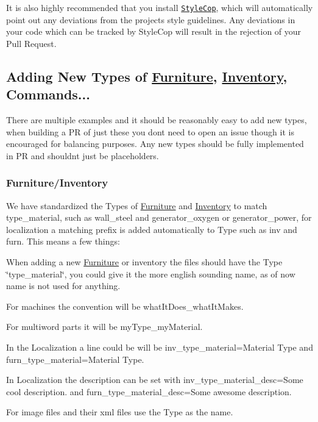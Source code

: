  

It is also highly recommended that you install \href{https://github.com/TeamPorcupine/ProjectPorcupine/wiki/StyleCop}{\tt Style\+Cop}, which will automatically point out any deviations from the project\textquotesingle{}s style guidelines. Any deviations in your code which can be tracked by Style\+Cop will result in the rejection of your Pull Request.

\subsection*{Adding New Types of \hyperlink{class_furniture}{Furniture}, \hyperlink{class_inventory}{Inventory}, Commands...}

There are multiple examples and it should be reasonably easy to add new types, when building a PR of just these you don\textquotesingle{}t need to open an issue though it is encouraged for balancing purposes. Any new types should be fully implemented in PR and shouldn\textquotesingle{}t just be placeholders.

\subsubsection*{Furniture/\+Inventory}

We have standardized the Types of \hyperlink{class_furniture}{Furniture} and \hyperlink{class_inventory}{Inventory} to match {\ttfamily type\+\_\+material}, such as {\ttfamily wall\+\_\+steel} and {\ttfamily generator\+\_\+oxygen} or {\ttfamily generator\+\_\+power}, for localization a matching prefix is added automatically to Type such as {\ttfamily inv} and {\ttfamily furn}. This means a few things\+:


\begin{DoxyItemize}
\item When adding a new \hyperlink{class_furniture}{Furniture} or inventory the files should have the Type \char`\"{}type\+\_\+material\char`\"{}, you could give it the more english sounding name, as of now name is not used for anything.
\item For machines the convention will be {\ttfamily what\+It\+Does\+\_\+what\+It\+Makes}.
\item For multiword parts it will be {\ttfamily my\+Type\+\_\+my\+Material}.
\item In the Localization a line could be will be {\ttfamily inv\+\_\+type\+\_\+material=Material Type} and {\ttfamily furn\+\_\+type\+\_\+material=Material Type}.
\item In Localization the description can be set with {\ttfamily inv\+\_\+type\+\_\+material\+\_\+desc=Some cool description.} and {\ttfamily furn\+\_\+type\+\_\+material\+\_\+desc=Some awesome description}.
\item For image files and their xml files use the Type as the name.
\end{DoxyItemize}

